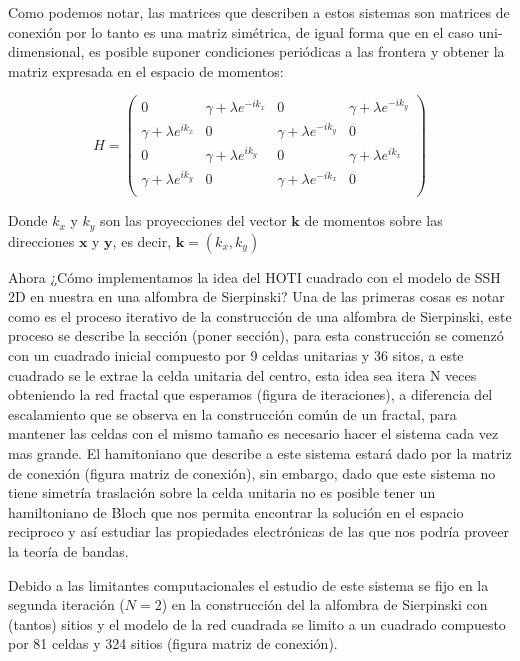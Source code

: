      
    Como podemos notar, las matrices que describen a estos sistemas son matrices de conexión por lo tanto es una matriz simétrica, de igual forma que en el caso uni-dimensional, es posible suponer condiciones periódicas a las frontera y obtener la matriz expresada en el espacio de momentos:
    
    \begin{equation}
    H =      
     \begin{pmatrix}
            0 & \gamma + \lambda e^{-ik_x} & 0 &  \gamma + \lambda e^{-ik_y} \\
             \gamma + \lambda e^{ik_x} & 0 &  \gamma + \lambda e^{-ik_y} & 0  \\
            0 & \gamma + \lambda e^{ik_y} & 0 &  \gamma + \lambda e^{ik_x} \\
             \gamma + \lambda e^{ik_y} & 0 &  \gamma + \lambda e^{-ik_x} & 0  \\
     \end{pmatrix} 
    \end{equation}

Donde $k_x$ y $k_y$ son las proyecciones del vector $\mathbf{k}$ de momentos sobre las direcciones $\mathbf{x}$ y $\mathbf{y}$, es decir, $\mathbf{k} = (k_x, k_y)$  


Ahora ¿Cómo implementamos la idea del HOTI cuadrado con el modelo de SSH 2D en nuestra en una alfombra de Sierpinski? Una de las primeras cosas es notar como es el proceso iterativo de la construcción de una alfombra de Sierpinski, este proceso se describe la sección (poner sección), para esta construcción se comenzó con un cuadrado inicial compuesto por 9 celdas unitarias y 36 sitos, a este cuadrado se le extrae la celda unitaria del centro, esta idea sea itera N veces obteniendo la red fractal que esperamos (figura de iteraciones), a diferencia del escalamiento que se observa en la construcción común de un fractal, para mantener las celdas con el mismo tamaño es necesario hacer el sistema cada vez mas grande. 
El hamitoniano que describe a este sistema estará dado por la matriz de conexión (figura matriz de conexión), sin embargo, dado que este sistema no tiene simetría traslación sobre la celda unitaria no es posible tener un hamiltoniano de Bloch que nos permita encontrar la solución en el espacio reciproco y así estudiar las propiedades electrónicas de las que nos podría proveer la teoría de bandas.

Debido a las limitantes computacionales el estudio de este sistema se fijo en la segunda  iteración ($N=2$) en la construcción del la alfombra de Sierpinski con (tantos) sitios y el modelo de la red cuadrada se limito a un cuadrado compuesto por 81 celdas y 324 sitios (figura matriz de conexión). 

